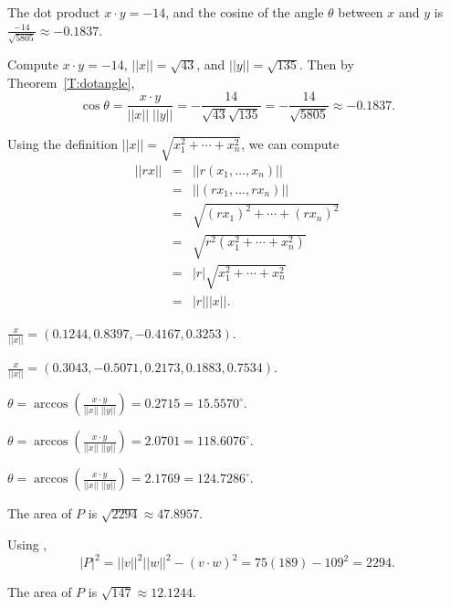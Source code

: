 \documentclass{ximera}
\begin{document}
 \ans The dot product $x \cdot y = -14$, and the cosine
of the angle $\theta$ between $x$ and $y$ is
$\frac{-14}{\sqrt{5805}} \approx -0.1837$.

\soln Compute $x \cdot y = -14$, $||x|| = \sqrt{43}$, and $||y|| = \sqrt{135}$.
Then by Theorem~\ref{T:dotangle},
\[
\cos\theta = \frac{x \cdot y}{||x||\;||y||} = -\frac{14}{\sqrt{43}\sqrt{135}}
= -\frac{14}{\sqrt{5805}} \approx -0.1837.
\]

 Using the definition $||x|| = \sqrt{x_1^2 + \cdots + x_n^2}$,
we can compute
\[
\begin{array}{rcl}
||rx|| & = & ||r(x_1,\dots,x_n)|| \\
& = & ||(rx_1,\dots,rx_n)|| \\
& = & \sqrt{(rx_1)^2 + \cdots + (rx_n)^2} \\
& = & \sqrt{r^2(x_1^2 + \cdots + x_n^2)} \\
& = & |r|\sqrt{x_1^2 + \cdots + x_n^2} \\
& = & |r| ||x||.
\end{array}
\]



$\frac{x}{||x||} = (0.1244, 0.8397, -0.4167, 0.3253)$.

$\frac{x}{||x||} = (0.3043, -0.5071, 0.2173, 0.1883, 0.7534)$.

 $\theta =
\arccos \left(\frac{x \cdot y}{||x||\;||y||}\right) =
0.2715 = 15.5570^\circ$.

 $\theta =
\arccos \left(\frac{x \cdot y}{||x||\;||y||}\right) =
2.0701 = 118.6076^\circ$.

 $\theta =
\arccos \left(\frac{x \cdot y}{||x||\;||y||}\right) =
2.1769 = 124.7286^\circ$.

 \ans The area of $P$ is $\sqrt{2294} \approx 47.8957$.

\soln Using ,
\[
|P|^2 = ||v||^2||w||^2 - (v \cdot w)^2 = 75(189) - 109^2 = 2294.
\]

 \ans The area of $P$ is $\sqrt{147} \approx 12.1244$.
\end{document}
